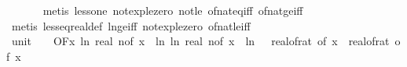 \begin{isabellebody}
\ \ \ \ \ \isamarkupfalse%
\ {\isacharparenleft}{\kern0pt}metis\ less{\isacharunderscore}{\kern0pt}one\ not{\isacharunderscore}{\kern0pt}exp{\isacharunderscore}{\kern0pt}le{\isacharunderscore}{\kern0pt}zero\ not{\isacharunderscore}{\kern0pt}le\ of{\isacharunderscore}{\kern0pt}nat{\isacharunderscore}{\kern0pt}eq{\isacharunderscore}{\kern0pt}{}{\isacharunderscore}{\kern0pt}iff\ of{\isacharunderscore}{\kern0pt}nat{\isacharunderscore}{\kern0pt}ge{\isacharunderscore}{\kern0pt}{}{\isacharunderscore}{\kern0pt}iff{\isacharparenright}{\kern0pt}\isanewline
\ \ \ \ \isamarkupfalse%
\ {\isacharparenleft}{\kern0pt}metis\ less{\isacharunderscore}{\kern0pt}eq{\isacharunderscore}{\kern0pt}real{\isacharunderscore}{\kern0pt}def\ ln{\isacharunderscore}{\kern0pt}ge{\isacharunderscore}{\kern0pt}iff\ not{\isacharunderscore}{\kern0pt}exp{\isacharunderscore}{\kern0pt}le{\isacharunderscore}{\kern0pt}zero\ of{\isacharunderscore}{\kern0pt}nat{\isacharunderscore}{\kern0pt}{}{\isacharunderscore}{\kern0pt}le{\isacharunderscore}{\kern0pt}iff{\isacharparenright}{\kern0pt}\isanewline
\isanewline
\ \ \isamarkupfalse%
\ unit{\isacharunderscore}{\kern0pt}{}{\isacharcolon}{\kern0pt}\ {\isachardoublequoteopen}{\isacharparenleft}{\kern0pt}{\isasymlambda}{\isacharunderscore}{\kern0pt}{\isachardot}{\kern0pt}\ {}{\isacharparenright}{\kern0pt}\ {\isasymin}\ O{\isacharbrackleft}{\kern0pt}{\isacharquery}{\kern0pt}F{\isacharbrackright}{\kern0pt}{\isacharparenleft}{\kern0pt}{\isasymlambda}x{\isachardot}{\kern0pt}\ ln\ {\isacharparenleft}{\kern0pt}real\ {\isacharparenleft}{\kern0pt}n{\isacharunderscore}{\kern0pt}of\ x{\isacharparenright}{\kern0pt}{\isacharparenright}{\kern0pt}\ {\isacharplus}{\kern0pt}\ {\isacharparenleft}{\kern0pt}ln\ {\isacharparenleft}{\kern0pt}ln\ {\isacharparenleft}{\kern0pt}real\ {\isacharparenleft}{\kern0pt}n{\isacharunderscore}{\kern0pt}of\ x{\isacharparenright}{\kern0pt}{\isacharparenright}{\kern0pt}{\isacharparenright}{\kern0pt}\ {\isacharplus}{\kern0pt}\ ln\ {\isacharparenleft}{\kern0pt}{}\ {\isacharslash}{\kern0pt}\ real{\isacharunderscore}{\kern0pt}of{\isacharunderscore}{\kern0pt}rat\ {\isacharparenleft}{\kern0pt}{\isasymdelta}{\isacharunderscore}{\kern0pt}of\ x{\isacharparenright}{\kern0pt}{\isacharparenright}{\kern0pt}{\isacharparenright}{\kern0pt}\ {\isacharslash}{\kern0pt}\ {\isacharparenleft}{\kern0pt}real{\isacharunderscore}{\kern0pt}of{\isacharunderscore}{\kern0pt}rat\ {\isacharparenleft}{\kern0pt}{\isasymdelta}{\isacharunderscore}{\kern0pt}of\ x{\isacharparenright}{\kern0pt}{\isacharparenright}{\kern0pt}\isanewline

\end{isabellebody}
